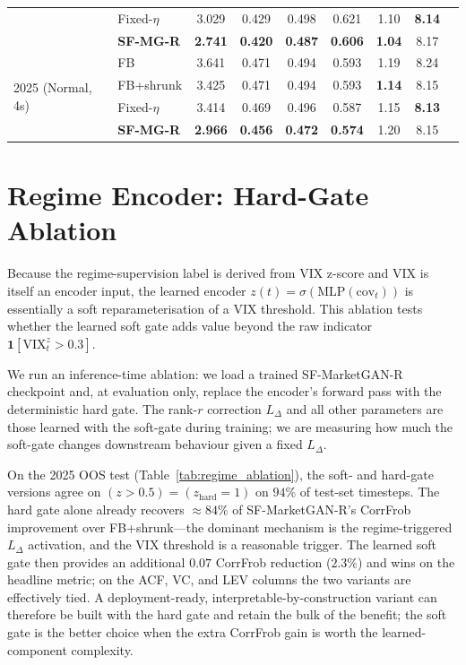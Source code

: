 \begin{table}[h]
\begin{tabular}{llccccccc}
                      & Fixed-$\eta$ & 3.029 & 0.429 & 0.498 & 0.621 & 1.10 & \textbf{8.14} \\
                      & \textbf{SF-MG-R} & \textbf{2.741} & \textbf{0.420} & \textbf{0.487} & \textbf{0.606} & \textbf{1.04} & 8.17 \\
\midrule
\multirow{4}{*}{2025 (Normal, 4s)} & FB & 3.641 & 0.471 & 0.494 & 0.593 & 1.19 & 8.24 \\
                      & FB+shrunk & 3.425 & 0.471 & 0.494 & 0.593 & \textbf{1.14} & 8.15 \\
                      & Fixed-$\eta$ & 3.414 & 0.469 & 0.496 & 0.587 & 1.15 & \textbf{8.13} \\
                      & \textbf{SF-MG-R} & \textbf{2.966} & \textbf{0.456} & \textbf{0.472} & \textbf{0.574} & 1.20 & 8.15 \\
\bottomrule
\end{tabular}
\end{table}

\section{Regime Encoder: Hard-Gate Ablation}
\label{app:regime_ablation}

Because the regime-supervision label is derived from VIX z-score and VIX is itself an encoder input, the learned encoder $z(t) = \sigma(\text{MLP}(\text{cov}_t))$ is essentially a soft reparameterisation of a VIX threshold. This ablation tests whether the learned soft gate adds value beyond the raw indicator $\mathbf{1}[\text{VIX}^z_t > 0.3]$.

We run an inference-time ablation: we load a trained SF-MarketGAN-R checkpoint and, at evaluation only, replace the encoder's forward pass with the deterministic hard gate. The rank-$r$ correction $L_\Delta$ and all other parameters are those learned with the soft-gate during training; we are measuring how much the soft-gate changes downstream behaviour given a fixed $L_\Delta$.

On the 2025 OOS test (Table~\ref{tab:regime_ablation}), the soft- and hard-gate versions agree on $(z > 0.5) = (z_\text{hard} = 1)$ on $94\%$ of test-set timesteps. The hard gate alone already recovers $\approx 84\%$ of SF-MarketGAN-R's CorrFrob improvement over FB+shrunk---the dominant mechanism is the regime-triggered $L_\Delta$ activation, and the VIX threshold is a reasonable trigger. The learned soft gate then provides an additional $0.07$ CorrFrob reduction ($2.3\%$) and wins on the headline metric; on the ACF, VC, and LEV columns the two variants are effectively tied. A deployment-ready, interpretable-by-construction variant can therefore be built with the hard gate and retain the bulk of the benefit; the soft gate is the better choice when the extra CorrFrob gain is worth the learned-component complexity.

